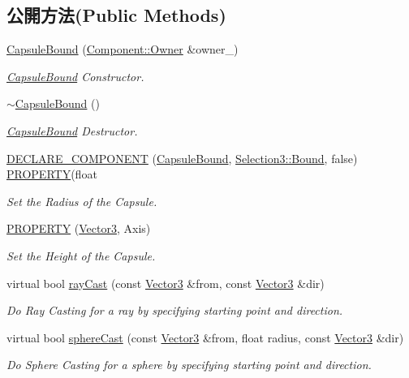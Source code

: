 \subsection*{公開方法(Public Methods)}
\begin{DoxyCompactItemize}
\item 
\hyperlink{class_magnum_1_1_capsule_bound_a45ffd80c8bf8d1ee62534349ad3f538a}{Capsule\+Bound} (\hyperlink{class_magnum_1_1_component_1_1_owner}{Component\+::\+Owner} \&owner\+\_\+)
\begin{DoxyCompactList}\small\item\em \hyperlink{class_magnum_1_1_capsule_bound}{Capsule\+Bound} Constructor. \end{DoxyCompactList}\item 
\hyperlink{class_magnum_1_1_capsule_bound_affadace6b799e24ec71123ac3d900e9f}{$\sim$\+Capsule\+Bound} ()
\begin{DoxyCompactList}\small\item\em \hyperlink{class_magnum_1_1_capsule_bound}{Capsule\+Bound} Destructor. \end{DoxyCompactList}\item 
\hyperlink{class_magnum_1_1_capsule_bound_a673a09b706898ad029e9177e90bce38b}{D\+E\+C\+L\+A\+R\+E\+\_\+\+C\+O\+M\+P\+O\+N\+E\+NT} (\hyperlink{class_magnum_1_1_capsule_bound}{Capsule\+Bound}, \hyperlink{class_magnum_1_1_selection3_1_1_bound}{Selection3\+::\+Bound}, false)   \hyperlink{class_magnum_1_1_capsule_bound_ac89621a313ff3d32e3b2835da6621827}{P\+R\+O\+P\+E\+R\+TY}(float
\begin{DoxyCompactList}\small\item\em Set the Radius of the Capsule. \end{DoxyCompactList}\item 
\hyperlink{class_magnum_1_1_capsule_bound_ac89621a313ff3d32e3b2835da6621827}{P\+R\+O\+P\+E\+R\+TY} (\hyperlink{class_magnum_1_1_vector3}{Vector3}, Axis)
\begin{DoxyCompactList}\small\item\em Set the Height of the Capsule. \end{DoxyCompactList}\item 
virtual bool \hyperlink{class_magnum_1_1_capsule_bound_ae0cacec055e7f03d46091f9ac47a8c09}{ray\+Cast} (const \hyperlink{class_magnum_1_1_vector3}{Vector3} \&from, const \hyperlink{class_magnum_1_1_vector3}{Vector3} \&dir)
\begin{DoxyCompactList}\small\item\em Do Ray Casting for a ray by specifying starting point and direction. \end{DoxyCompactList}\item 
virtual bool \hyperlink{class_magnum_1_1_capsule_bound_a91d978bfd2dded0d9e0c3528c1941b70}{sphere\+Cast} (const \hyperlink{class_magnum_1_1_vector3}{Vector3} \&from, float radius, const \hyperlink{class_magnum_1_1_vector3}{Vector3} \&dir)
\begin{DoxyCompactList}\small\item\em Do Sphere Casting for a sphere by specifying starting point and direction. \end{DoxyCompactList}\end{DoxyCompactItemize}
